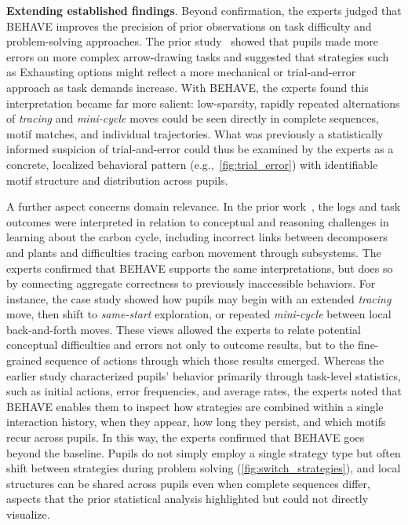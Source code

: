 \documentclass[letterpaper,journal]{IEEEtran}
\begin{document}
\noindent
\textbf{Extending established findings}.
Beyond confirmation, the experts judged that \textsc{BEHAVE} improves the precision of prior observations on task difficulty and problem-solving approaches.
The prior study~\cite{host2026pupils} showed that pupils made more errors on more complex arrow-drawing tasks and suggested that strategies such as Exhausting options might reflect a more mechanical or trial-and-error approach as task demands increase.
With \textsc{BEHAVE}, the experts found this interpretation became far more salient: low-sparsity, rapidly repeated alternations of \textit{tracing} and \textit{mini-cycle} moves could be seen directly in complete sequences, motif matches, and individual trajectories.
What was previously a statistically informed suspicion of trial-and-error could thus be examined by the experts as a concrete, localized behavioral pattern (e.g.,~\cref{fig:trial_error}) with identifiable motif structure and distribution across pupils.

A further aspect concerns domain relevance.
In the prior work~\cite{host2026pupils}, the logs and task outcomes were interpreted in relation to conceptual and reasoning challenges in learning about the carbon cycle, including incorrect links between decomposers and plants and difficulties tracing carbon movement through subsystems.
The experts confirmed that \textsc{BEHAVE} supports the same interpretations, but does so by connecting aggregate correctness to previously inaccessible behaviors.
For instance, the case study showed how pupils may begin with an extended \textit{tracing} move, then shift to \textit{same-start} exploration, or repeated \textit{mini-cycle} between local back-and-forth moves.
These views allowed the experts to relate potential conceptual difficulties and errors not only to outcome results, but to the fine-grained sequence of actions through which those results emerged.
Whereas the earlier study characterized pupils' behavior primarily through task-level statistics, such as initial actions, error frequencies, and average rates, the experts noted that \textsc{BEHAVE} enables them to inspect how strategies are combined within a single interaction history, when they appear, how long they persist, and which motifs recur across pupils.
In this way, the experts confirmed that \textsc{BEHAVE} goes beyond the baseline.
Pupils do not simply employ a single strategy type but often shift between strategies during problem solving (\cref{fig:switch_strategies}), and local structures can be shared across pupils even when complete sequences differ, aspects that the prior statistical analysis highlighted but could not directly visualize.
\end{document}
